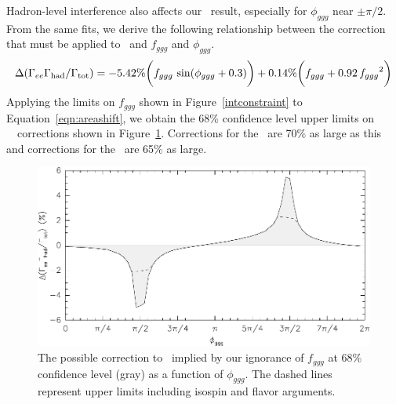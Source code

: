 \documentclass{cornell}
\begin{document}
Hadron-level interference also affects our \geehadtot\ result,
especially for $\phi_{ggg}$ near $\pm \pi/2$.  From the same fits, we
derive the following relationship between the correction that must be
applied to \geehadtot\ and $f_{ggg}$ and $\phi_{ggg}$.
\begin{equation}
  \Delta(\Gamma_{ee}\Gamma_{\mbox{\scriptsize had}}/\Gamma_{\mbox{\scriptsize tot}}) = -5.42\%
  \bigg(f_{ggg} \, \sin(\phi_{ggg} + 0.3) \bigg)
  + 0.14\% \bigg(f_{ggg} + 0.92 \, {f_{ggg}}^2 \bigg)
  \label{eqn:areashift}
\end{equation}
Applying the limits on $f_{ggg}$ shown in Figure~\ref{intconstraint}
to Equation~\ref{eqn:areashift}, we obtain the 68\% confidence level
upper limits on \us\ \geehadtot\ corrections shown in
Figure~\ref{areaconstraint}.  Corrections for the \uss\ are 70\% as
large as this and corrections for the \usss\ are 65\% as large.

\begin{figure}[p]
  \begin{center}
    \includegraphics[width=0.8\linewidth]{plots/areaconstraint}
  \end{center}
  \caption[Upper limits on \gee\ corrections due
  Strong/Electromagnetic interference]{\label{areaconstraint} The
  possible correction to \geehadtot\ implied by our ignorance of
  $f_{ggg}$ at 68\% confidence level (gray) as a function of
  $\phi_{ggg}$.  The dashed lines represent upper limits including
  isospin and flavor arguments.}
\end{figure}
\end{document}
